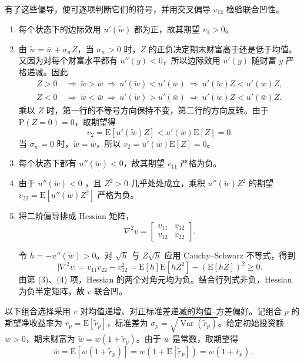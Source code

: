 \begin{solution}[label-content={证明},blank-type=none]
有了这些偏导，便可逐项判断它们的符号，并用交叉偏导 $v_{12}$ 检验联合凹性。
\begin{enumerate}[label=(\arabic*)]
 \item 每个状态下的边际效用 $u'(\widetilde w)$ 都为正，故其期望 $v_1>0$。
 \item 由 $\widetilde w=\bar w+\sigma_w Z$，当 $\sigma_w>0$ 时，$Z$ 的正负决定期末财富高于还是低于均值。又因为对每个财富水平都有 $u''(y)<0$，所以边际效用 $u'(y)$ 随财富 $y$ 严格递减。因此
 \[
  \begin{aligned}
   Z>0&\ \Longrightarrow\ \widetilde w>\bar w
          \ \Longrightarrow\ u'(\widetilde w)<u'(\bar w)
          \ \Longrightarrow\ u'(\widetilde w)Z<u'(\bar w)Z,\\
   Z<0&\ \Longrightarrow\ \widetilde w<\bar w
          \ \Longrightarrow\ u'(\widetilde w)>u'(\bar w)
          \ \Longrightarrow\ u'(\widetilde w)Z<u'(\bar w)Z.
  \end{aligned}
 \]
 乘以 $Z$ 时，第一行的不等号方向保持不变，第二行的方向反转。由于 $\mathrm P(Z=0)=0$，取期望得
 \[
  v_2=\mathrm E[u'(\widetilde w)Z]<u'(\bar w)\mathrm E[Z]=0.
 \]
 当 $\sigma_w=0$ 时，$\widetilde w=\bar w$，所以 $v_2=u'(\bar w)\mathrm E[Z]=0$。
 \item 每个状态下都有 $u''(\widetilde w)<0$，故其期望 $v_{11}$ 严格为负。
 \item 由于 $u''(\widetilde w)<0$ ，且 $Z^2>0$ 几乎处处成立，乘积 $u''(\widetilde w)Z^2$ 的期望 $v_{22}=\mathrm E[u''(\widetilde w)Z^2]$ 严格为负。
 \item 将二阶偏导排成 Hessian 矩阵，
 \[
  \nabla^2 v=\begin{bmatrix}v_{11}&v_{12}\\v_{12}&v_{22}\end{bmatrix}.
 \]

 令 $h=-u''(\widetilde w)>0$。对 $\sqrt h$ 与 $Z\sqrt h$ 应用 Cauchy--Schwarz 不等式，得到
 \[
  \lvert\nabla^2 v\rvert=v_{11}v_{22}-v_{12}^2
  =\mathrm E[h]\mathrm E[hZ^2]-(\mathrm E[hZ])^2\ge0.
 \]
 由第 (3)、(4) 项，Hessian 的两个对角元均为负。结合行列式非负，Hessian 为负半定矩阵，故 $v$ 联合凹。
\end{enumerate}
\end{solution}

以下组合选择采用 $v$ 对均值递增、对正标准差递减的均值--方差偏好。记组合 $p$ 的期望净收益率为 $\bar r_p=\mathrm E[\widetilde r_p]$，标准差为 $\sigma_p=\sqrt{\operatorname{Var}(\widetilde r_p)}$。给定初始投资额 $w>0$，期末财富为 $\widetilde w=w(1+\widetilde r_p)$。由于 $w$ 是常数，取期望得
\[
 \bar w=\mathrm E[w(1+\widetilde r_p)]
 =w(1+\mathrm E[\widetilde r_p])=w(1+\bar r_p).
\]

